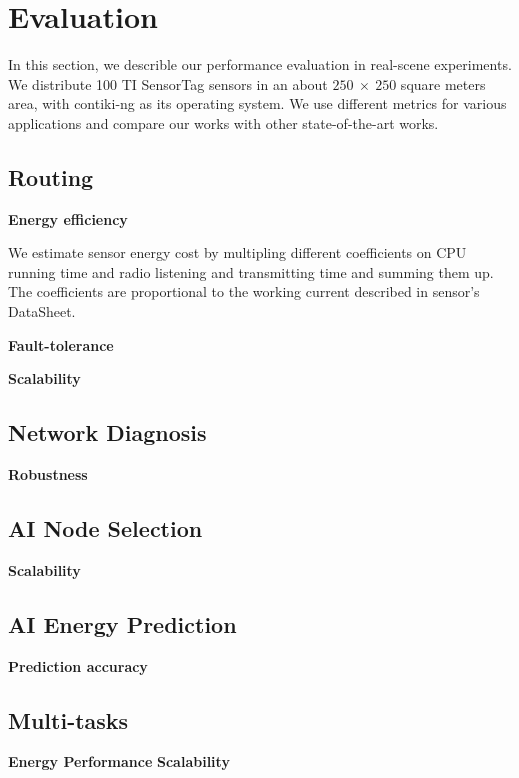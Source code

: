 \section{Evaluation}
\label{Eva}

In this section, we describle our performance evaluation in real-scene
experiments. We distribute 100 TI SensorTag sensors in an about $250~\times~250$
square meters area, with contiki-ng as its operating system. We use different
metrics for various applications and compare our works with other
state-of-the-art works.

\subsection{Routing}
\textbf{Energy efficiency}

We estimate sensor energy cost by multipling different coefficients on CPU
running time and radio listening and transmitting time and summing them up. The
coefficients are proportional to the working current described in sensor's
DataSheet.

\textbf{Fault-tolerance}

\textbf{Scalability}

\subsection{Network Diagnosis}
\textbf{Robustness}

\subsection{AI Node Selection}
\textbf{Scalability}

\subsection{AI Energy Prediction}
\textbf{Prediction accuracy}

\subsection{Multi-tasks}
\textbf{Energy Performance}
\textbf{Scalability}
